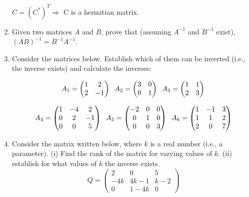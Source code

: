 \documentclass[fleqn]{article}
\begin{document}
\begin{enumerate}
      \textcolor{hwColor}{$C=(C^*)^T\Longrightarrow$ C is a hermitian matrix.}


    \item  Given two matrices $A$ and $B$,  prove that (assuming $A^{-1}$ and $B^{-1}$ exist),
    $(AB)^{-1} = B^{-1}A^{-1} $.  


    \item  Consider the matrices below. Establish which of them can be inverted (i.e., the inverse exists) and calculate the inverses: 

      $$A_1 = 
      \begin{pmatrix}
        1 & 2 \\
        2 & -1
      \end{pmatrix}\hskip 0.2truecm 
      A_2=\begin{pmatrix}
        3 & 0 \\
        0 & 1
      \end{pmatrix}\hskip 0.2truecm
      A_3=\begin{pmatrix}
        1 & 1 \\
        2 & 3
      \end{pmatrix}
      $$

      $$A_4 = 
      \begin{pmatrix}
        1 & -4 & 2 \\
        0 & 2 & -1 \\
        0 & 0 & 5
      \end{pmatrix}\hskip 0.2truecm 
      A_5=\begin{pmatrix}
        -2 & 0 & 0 \\
        0 & 1 & 0 \\
        0 & 0 & 3
      \end{pmatrix}\hskip 0.2truecm
      A_6=\begin{pmatrix}
        1 & -1 & 3 \\
        1 & 1 & 2 \\
        2 & 0 & 7
      \end{pmatrix}
      $$
    
    
    \item  Consider the matrix written below, where $k$ is a real number (i.e., a parameter). (i) Find the rank of the matrix for varying values of $k$. (ii) establish for what values of $k$ the inverse exists. 
      $$
      Q = 
      \begin{pmatrix}
      2 & 0 & 5 \\
      -4k & 4k-1 & k-2 \\
      0 & 1-4k & 0
      \end{pmatrix}
      $$

  \end{enumerate}
\end{document}
